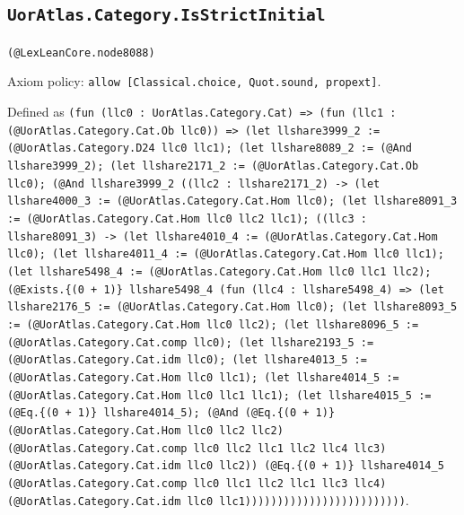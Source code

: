 \documentclass[11pt]{article}
\begin{document}
\subsection*{\texttt{UorAtlas.Category.IsStrictInitial}}
\noindent\texttt{(@LexLeanCore.node8088)}\par
\noindent Axiom policy: \texttt{allow [Classical.choice, Quot.sound, propext]}.\par
\noindent Defined as \texttt{(fun (llc0 : UorAtlas.Category.Cat) => (fun (llc1 : (@UorAtlas.Category.Cat.Ob llc0)) => (let llshare3999\_2 := (@UorAtlas.Category.D24 llc0 llc1); (let llshare8089\_2 := (@And llshare3999\_2); (let llshare2171\_2 := (@UorAtlas.Category.Cat.Ob llc0); (@And llshare3999\_2 ((llc2 : llshare2171\_2) -> (let llshare4000\_3 := (@UorAtlas.Category.Cat.Hom llc0); (let llshare8091\_3 := (@UorAtlas.Category.Cat.Hom llc0 llc2 llc1); ((llc3 : llshare8091\_3) -> (let llshare4010\_4 := (@UorAtlas.Category.Cat.Hom llc0); (let llshare4011\_4 := (@UorAtlas.Category.Cat.Hom llc0 llc1); (let llshare5498\_4 := (@UorAtlas.Category.Cat.Hom llc0 llc1 llc2); (@Exists.\{(0 + 1)\} llshare5498\_4 (fun (llc4 : llshare5498\_4) => (let llshare2176\_5 := (@UorAtlas.Category.Cat.Hom llc0); (let llshare8093\_5 := (@UorAtlas.Category.Cat.Hom llc0 llc2); (let llshare8096\_5 := (@UorAtlas.Category.Cat.comp llc0); (let llshare2193\_5 := (@UorAtlas.Category.Cat.idm llc0); (let llshare4013\_5 := (@UorAtlas.Category.Cat.Hom llc0 llc1); (let llshare4014\_5 := (@UorAtlas.Category.Cat.Hom llc0 llc1 llc1); (let llshare4015\_5 := (@Eq.\{(0 + 1)\} llshare4014\_5); (@And (@Eq.\{(0 + 1)\} (@UorAtlas.Category.Cat.Hom llc0 llc2 llc2) (@UorAtlas.Category.Cat.comp llc0 llc2 llc1 llc2 llc4 llc3) (@UorAtlas.Category.Cat.idm llc0 llc2)) (@Eq.\{(0 + 1)\} llshare4014\_5 (@UorAtlas.Category.Cat.comp llc0 llc1 llc2 llc1 llc3 llc4) (@UorAtlas.Category.Cat.idm llc0 llc1)))))))))))))))))))))))))}.\par
\end{document}

